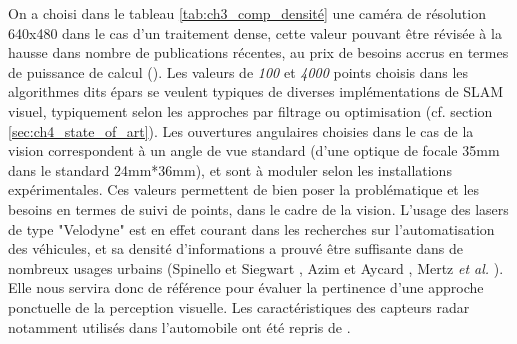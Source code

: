 On a choisi dans le tableau \ref{tab:ch3_comp_densité} une caméra de résolution 640x480 dans le cas d'un traitement dense, cette valeur pouvant être révisée à la hausse dans nombre de publications récentes, au prix de besoins accrus en termes de puissance de calcul (\cite{Lategahn2011}). Les valeurs de \emph{100} et \emph{4000} points choisis dans les algorithmes dits épars se veulent typiques de diverses implémentations de SLAM visuel, typiquement selon les approches par filtrage ou optimisation (cf. section \ref{sec:ch4_state_of_art}). Les ouvertures angulaires choisies dans le cas de la vision correspondent à un angle de vue \og standard\fg{} (d'une optique de focale 35mm dans le standard 24mm*36mm), et sont à moduler selon les installations expérimentales. Ces valeurs permettent de bien poser la problématique et les besoins en termes de suivi de points, dans le cadre de la vision. L'usage des lasers de type "Velodyne" est en effet courant dans les recherches sur l'automatisation des véhicules, et sa densité d'informations a prouvé être suffisante dans de nombreux usages urbains (Spinello et Siegwart \cite{Spinello2010}, Azim et Aycard \cite{Azim}, Mertz \textit{et al.} \cite{Mertz2013}). Elle nous servira donc de référence pour évaluer la pertinence d'une approche ponctuelle de la perception visuelle. Les caractéristiques des capteurs radar notamment utilisés dans l'automobile ont été repris de \cite{Schneider2006}.

